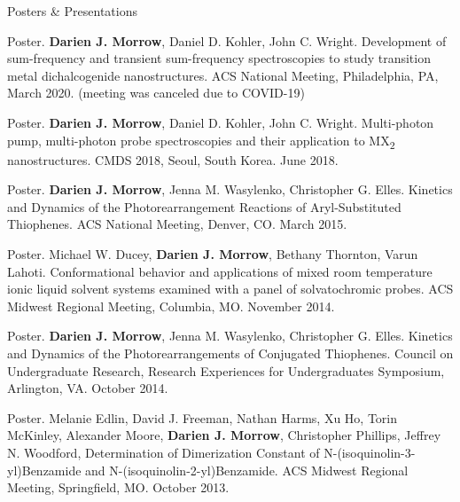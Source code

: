 \documentclass{resume} %
\begin{document}
\begin{rSection}{Posters \& Presentations}
	
	
\begin{etaremune}
	\item Poster. \textbf{Darien J. Morrow}, Daniel D. Kohler, John C. Wright. Development of sum-frequency and transient sum-frequency spectroscopies to study transition metal dichalcogenide nanostructures. ACS National Meeting, Philadelphia, PA, March 2020. (meeting was canceled due to COVID-19) 
	
	\item Poster. \textbf{Darien J. Morrow}, Daniel D. Kohler, John C. Wright. Multi-photon pump, multi-photon probe spectroscopies and their application to MX\textsubscript{2} nanostructures. CMDS 2018, Seoul, South Korea. June 2018.

	\item Poster. \textbf{Darien J. Morrow}, Jenna M. Wasylenko, Christopher G. Elles. Kinetics and
	Dynamics of the Photorearrangement Reactions of Aryl-Substituted Thiophenes. ACS National Meeting, Denver, CO. March 2015. 
	
	\item Poster. Michael W. Ducey, \textbf{Darien J. Morrow}, Bethany Thornton, Varun Lahoti. Conformational behavior and applications of mixed room temperature ionic liquid solvent systems examined with a panel of solvatochromic probes. ACS Midwest Regional Meeting, Columbia, MO. November 2014.
	
	\item Poster. \textbf{Darien J. Morrow}, Jenna M. Wasylenko, Christopher G. Elles. Kinetics and Dynamics of the Photorearrangements of Conjugated Thiophenes. Council on Undergraduate Research, Research Experiences for Undergraduates Symposium, Arlington, VA. October 2014.
	
	
	
	\item Poster. Melanie Edlin, David J. Freeman, Nathan Harms, Xu Ho, Torin McKinley, Alexander Moore, \textbf{Darien J. Morrow}, Christopher Phillips, Jeffrey N. Woodford, Determination of Dimerization Constant of N-(isoquinolin-3-yl)Benzamide and N-(isoquinolin-2-yl)Benzamide. ACS Midwest Regional Meeting, Springfield, MO. October 2013.
	

\end{etaremune}
\end{rSection}
\end{document}
